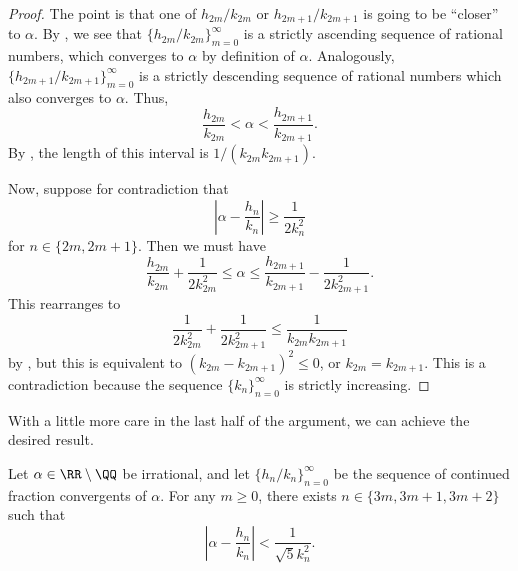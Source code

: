 \documentclass[../notes.tex]{subfiles}
\begin{document}
\begin{proof}
	The point is that one of $h_{2m}/k_{2m}$ or $h_{2m+1}/k_{2m+1}$ is going to be ``closer'' to $\alpha$. By , we see that $\{h_{2m}/k_{2m}\}_{m=0}^\infty$ is a strictly ascending sequence of rational numbers, which converges to $\alpha$ by definition of $\alpha$. Analogously, $\{h_{2m+1}/k_{2m+1}\}_{m=0}^\infty$ is a strictly descending sequence of rational numbers which also converges to $\alpha$. Thus,
	\[\frac{h_{2m}}{k_{2m}}<\alpha<\frac{h_{2m+1}}{k_{2m+1}}.\]
	By , the length of this interval is $1/(k_{2m}k_{2m+1})$.

	Now, suppose for contradiction that
	\[\left|\alpha-\frac{h_n}{k_n}\right|\ge\frac1{2k_n^2}\]
	for $n\in\{2m,2m+1\}$. Then we must have
	\[\frac{h_{2m}}{k_{2m}}+\frac1{2k_{2m}^2}\le\alpha\le\frac{h_{2m+1}}{k_{2m+1}}-\frac1{2k_{2m+1}^2}.\]
	This rearranges to
	\[\frac1{2k_{2m}^2}+\frac1{2k_{2m+1}^2}\le\frac1{k_{2m}k_{2m+1}}\]
	by , but this is equivalent to $(k_{2m}-k_{2m+1})^2\le0$, or $k_{2m}=k_{2m+1}$. This is a contradiction because the sequence $\{k_n\}_{n=0}^\infty$ is strictly increasing.
\end{proof}
With a little more care in the last half of the argument, we can achieve the desired result.
\begin{theorem}[Hurwitz] \label{thm:hurwitz}
	Let $\alpha\in\RR\setminus\QQ$ be irrational, and let $\{h_n/k_n\}_{n=0}^\infty$ be the sequence of continued fraction convergents of $\alpha$. For any $m\ge0$, there exists $n\in\{3m,3m+1,3m+2\}$ such that
	\[\left|\alpha-\frac{h_n}{k_n}\right|<\frac1{\sqrt 5k_n^2}.\]
\end{theorem}
\end{document}
